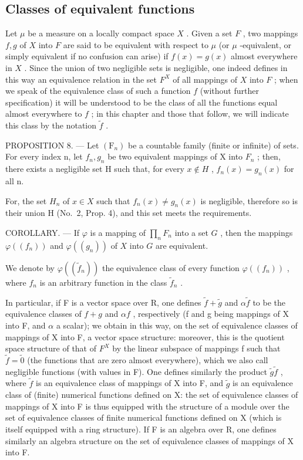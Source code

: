 \subsection{Classes of equivalent functions}

Let \(\mu\) be a measure on a locally compact space \(X\) . Given a set \(F\) , two mappings \(f, g\) of \(X\) into \(F\) are said to be equivalent with respect to \(\mu\) (or \(\mu\) -equivalent, or simply equivalent if no confusion can arise) if \(f(x) = g(x)\) almost everywhere in \(X\) . Since the union of two negligible sets is negligible, one indeed defines in this way an equivalence relation in the set \(F^X\) of all mappings of \(X\) into \(F\) ; when we speak of the equivalence class of such a function \(f\) (without further specification) it will be understood to be the class of all the functions equal almost everywhere to \(f\) ; in this chapter and those that follow, we will indicate this class by the notation \(\widetilde{f}\) .

PROPOSITION 8. --- Let \((\mathrm{F}_{n})\) be a countable family (finite or infinite) of sets. For every index n, let \(f_{n}, g_{n}\) be two equivalent mappings of X into \(F_{n}\) ; then, there exists a negligible set H such that, for every \(x \notin H\) , \(f_{n}(x) = g_{n}(x)\) for all n.

For, the set \(H_{n}\) of \(x \in X\) such that \(f_{n}(x) \neq g_{n}(x)\) is negligible, therefore so is their union H (No.~2, Prop. 4), and this set meets the requirements.

COROLLARY. --- If \(\varphi\) is a mapping of \(\prod_{n} F_n\) into a set \(G\) , then the mappings \(\varphi((f_n))\) and \(\varphi((g_n))\) of \(X\) into \(G\) are equivalent.

We denote by \(\varphi((\widetilde{f}_n))\) the equivalence class of every function \(\varphi((f_n))\) , where \(f_n\) is an arbitrary function in the class \(\widetilde{f}_n\) .

In particular, if F is a vector space over R, one defines \(\widetilde{f} + \widetilde{g}\) and \(\alpha\widetilde{f}\) to be the equivalence classes of \(f + g\) and \(\alpha f\) , respectively (f and g being mappings of X into F, and \(\alpha\) a scalar); we obtain in this way, on the set of equivalence classes of mappings of X into F, a vector space structure: moreover, this is the quotient space structure of that of \(F^{X}\) by the linear subspace of mappings f such that \(\widetilde{f} = \widetilde{0}\) (the functions that are zero almost everywhere), which we also call negligible functions (with values in F). One defines similarly the product \(\widetilde{g}\widetilde{f}\) , where \(\widetilde{f}\) is an equivalence class of mappings of X into F, and \(\widetilde{g}\) is an equivalence class of (finite) numerical functions defined on X: the set of equivalence classes of mappings of X into F is thus equipped with the structure of a module over the set of equivalence classes of finite numerical functions defined on X (which is itself equipped with a ring structure). If F is an algebra over R, one defines similarly an algebra structure on the set of equivalence classes of mappings of X into F.

